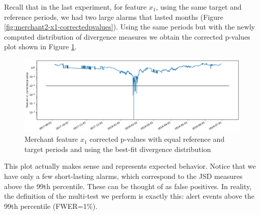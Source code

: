 \documentclass[sigconf]{acmart}
\begin{document}
Recall that in the last experiment, for feature $x_1$, using the same target and reference periods, we had two large alarms that lasted months (Figure \ref{fig:merchant2-x1-correctedpvalues}). Using the same periods but with the newly computed distribution of divergence measures we obtain the corrected p-values plot shown in Figure \ref{fig:merchant3-x1-correctedpvalues}.
\begin{figure}[!htb]
    \begin{center}
      \includegraphics[scale=0.25]{figures/merchant3-x1-correctedpvalues.pdf}
      \caption{Merchant feature $x_1$ corrected p-values with equal reference and target periods and using the best-fit divergence distribution}
      \label{fig:merchant3-x1-correctedpvalues}
    \end{center}
\end{figure}
This plot actually makes sense and represents expected behavior. Notice that we have only a few short-lasting alarms, which correspond to the JSD measures above the 99th percentile. These can be thought of as false positives. In reality, the definition of the multi-test we perform is exactly this: alert events above the 99th percentile (FWER=1\%).
\end{document}
